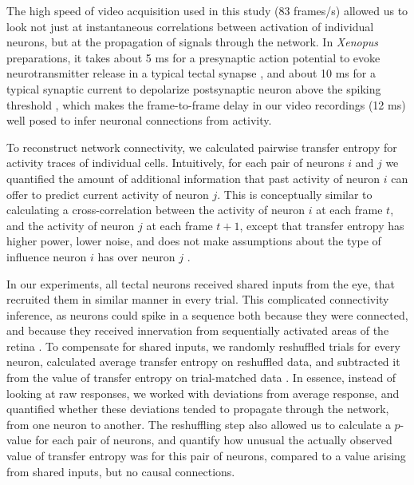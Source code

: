 \documentclass{article}
\begin{document}
The high speed of video acquisition used in this study (83 frames/s) allowed us to look not just at instantaneous correlations between activation of individual neurons, but at the propagation of signals through the network. In \textit{Xenopus} preparations, it takes about 5 ms for a presynaptic action potential to evoke neurotransmitter release in a typical tectal synapse \citep{khakhalin2012}, and about 10 ms for a typical synaptic current to depolarize postsynaptic neuron above the spiking threshold \citep{ciarleglio2015,busch2019}, which makes the frame-to-frame delay in our video recordings (12 ms) well posed to infer neuronal connections from activity.

To reconstruct network connectivity, we calculated pairwise transfer entropy \citep{gourevitch2007te,stetter2012te} for activity traces of individual cells. Intuitively, for each pair of neurons $i$ and $j$ we quantified the amount of additional information that past activity of neuron $i$ can offer to predict current activity of neuron $j$. This is conceptually similar to calculating a cross-correlation between the activity of neuron $i$ at each frame $t$, and the activity of neuron $j$ at each frame $t+1$, except that transfer entropy has higher power, lower noise, and does not make assumptions about the type of influence neuron $i$ has over neuron $j$ \citep{stetter2012te}.

In our experiments, all tectal neurons received shared inputs from the eye, that recruited them in similar manner in every trial. This complicated connectivity inference, as neurons could spike in a sequence both because they were connected, and because they received innervation from sequentially activated areas of the retina \citep{mehler2018lure}. To compensate for shared inputs, we randomly reshuffled trials for every neuron, calculated average transfer entropy on reshuffled data, and subtracted it from the value of transfer entropy on trial-matched data \citep{gourevitch2007te,wollstadt2014te}. In essence, instead of looking at raw responses, we worked with deviations from average response, and quantified whether these deviations tended to propagate through the network, from one neuron to another. The reshuffling step also allowed us to calculate a $p$-value for each pair of neurons, and quantify how unusual the actually observed value of transfer entropy was for this pair of neurons, compared to a value arising from shared inputs, but no causal connections.
\end{document}
